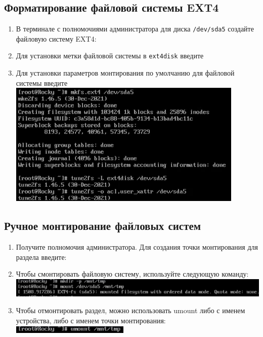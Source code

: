 \documentclass[12pt]{article}
\begin{document}
\subsection{Форматирование файловой системы EXT4}
\begin{enumerate}
	\item В терминале с полномочиями администратора для диска \texttt{/dev/sda5} создайте файловую систему EXT4:
	\item Для установки метки файловой системы в \texttt{ext4disk} введите
	\item Для установки параметров монтирования по умолчанию для файловой системы введите
	      \\\includegraphics{8.png}
\end{enumerate}

\subsection{Ручное монтирование файловых систем}
\begin{enumerate}
	\item Получите полномочия администратора. Для создания точки монтирования для раздела введите:
	\item Чтобы смонтировать файловую систему, используйте следующую команду:
	      \\\includegraphics{9.png}
	\item Чтобы отмонтировать раздел, можно использовать umount либо с именем устройства, либо с именем точки монтирования:
	      \\\includegraphics{10.png}
\end{enumerate}
\end{document}
